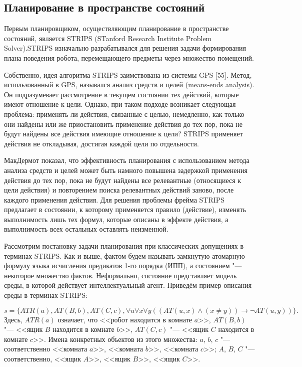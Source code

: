 \documentclass[b5paper,11pt]{book}
\numberwithin{Def}{section}
\numberwithin{Th}{chapter}
\numberwithin{St}{chapter}
\begin{document}
	\subsection{Планирование в пространстве состояний}
	
	Первым планировщиком, осуществляющим планирование в пространстве состояний, является STRIPS (STanford Research Institute Problem Solver).STRIPS изначально разрабатывался для решения задачи формирования плана поведения робота, перемещающего предметы через множество помещений.
	
	Собственно, идея алгоритма STRIPS заимствована из системы GPS [55]. Метод, использованный в GPS, назывался анализ средств и целей (means-ends analysis). Он подразумевает рассмотрение в текущем состоянии тех действий, которые имеют отношение к цели. Однако, при таком подходе возникает следующая проблема: применять ли действия, связанные с целью, немедленно, как только они найдены или же приостановить применение действия до тех пор, пока не будут найдены все действия имеющие отношение к цели? STRIPS применяет действия не откладывая, достигая каждой цели по отдельности.
	
	МакДермот показал, что эффективность планирования с использованием метода анализа средств и целей может быть намного повышена задержкой применения действия до тех пор, пока не будут найдены все релевантные (относящиеся к цели действия) и повторением поиска релевантных действий заново, после каждого применения действия.	Для решения проблемы фрейма STRIPS предлагает в состоянии, к которому применяется правило (действие), изменять выполнимость лишь тех формул, которые описаны в эффекте действия, а выполнимость всех остальных оставлять неизменной.
	
	Рассмотрим постановку задачи планирования при классических допущениях в терминах STRIPS.	Как и выше, фактом будем называть замкнутую атомарную формулу языка исчисления предикатов 1-го порядка (ИПП), а состоянием "--- некоторое множество фактов. Неформально, состояние представляет модель среды, в которой действует  интеллектуальный агент.
	Приведём пример описания среды в терминах STRIPS:
	
	\[
		s = \{ATR(a), AT(B,b), AT(C,c), \forall u\forall x\forall y ((AT(u,x) \wedge (x \not= y)) \rightarrow \neg AT(u,y))\}.
	\]
	Здесь, $ATR(a)$ означает, что <<робот находится в комнате $a$>>, $AT(B,b)$ "--- <<ящик $B$ находится в комнате $b$>>, $AT(C,c)$ "--- <<ящик $C$ находится в комнате $c$>>. Имена конкретных объектов из этого множества: $a$, $b$, $c$ "--- соответственно <<комната $a$>>, <<комната $b$>>, <<комната $c$>>; $A$, $B$, $C$ "--- соответственно, <<ящик $A$>>, <<ящик $B$>>, <<ящик $C$>>.
	
\end{document}
